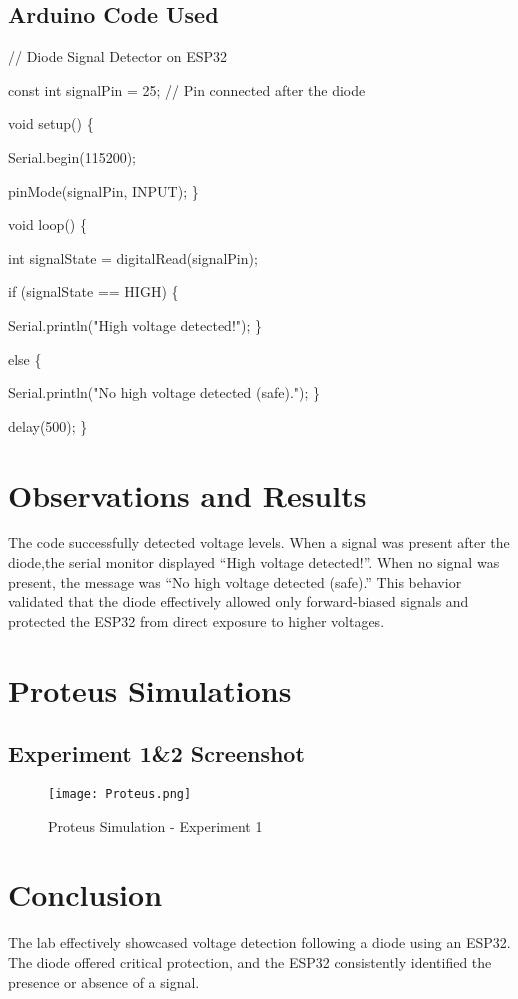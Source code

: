 \documentclass{article}
\begin{document}
\subsection{Arduino Code Used}

\item // Diode Signal Detector on ESP32
\item const int signalPin = 25; // Pin connected after the diode
\item void setup()
  \{
\item Serial.begin(115200);
\item pinMode(signalPin, INPUT);
 \}
\item void loop()
  \{
\item int signalState = digitalRead(signalPin);
\item if (signalState == HIGH)
 \{
\item Serial.println("High voltage detected!");
\}
\item else
  \{
\item Serial.println("No high voltage detected (safe).");
\}
\item delay(500);
\}


\section{Observations and Results}
The code successfully detected voltage levels. When a signal was present after the diode,the serial monitor displayed “High voltage detected!”. When no signal was present, the message was “No high voltage detected (safe).”
This behavior validated that the diode effectively allowed only forward-biased signals and protected the ESP32 from direct exposure to higher voltages.

\newpage

\section{ Proteus Simulations}
\subsection{ Experiment 1&2 Screenshot}
\begin{figure}[h]
    \centering
    \texttt{[image: Proteus.png]}
    \caption{Proteus Simulation - Experiment 1}
    \label{fig:image}
\end{figure}

\section{Conclusion}
The lab effectively showcased voltage detection following a diode using an ESP32. The diode offered critical protection, and the ESP32 consistently identified the presence or absence of a signal.
\end{document}
